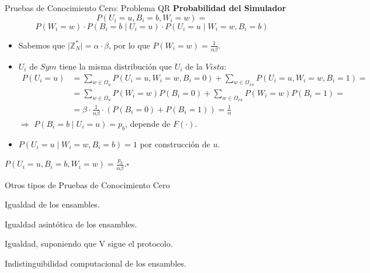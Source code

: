 \documentclass{beamer}
\begin{document}
\begin{frame}{Pruebas de Conocimiento Cero: Problema QR}
	\textbf{Probabilidad del Simulador}
	{\small\[P(U_i=u, B_i=b, W_i=w) = \]
	\[P(W_i=w)\cdot P(B_i=b \mid U_i=u) \cdot P(U_i=u \mid W_i=w, B_i=b)\]}
	\begin{itemize}
		\item {\small Sabemos que $\mid \mathbb{Z}^*_N \mid = \alpha \cdot \beta $, por lo que $P(W_i=w) = \frac{1}{\alpha \beta}$.}
		\item {\small $U_i$ de $Sym$ tiene la misma distribución que $U_i$ de la $Vista$:} {\tiny\begin{align*}
			P(U_i=u) &= \sum_{w\in \Omega_u} P(U_i=u, W_i=w, B_i = 0) + \sum_{w\in \Omega_{xu}} P(U_i=u, W_i=w, B_i = 1) =  \\
			&= \sum_{w\in \Omega_u} P(W_i=w)P(B_i = 0) + \sum_{w\in \Omega_{xu}} P(W_i=w)P(B_i = 1) = \\
			&=\beta \cdot \frac{1}{\alpha \beta} \cdot (P(B_i=0) + P(B_i=1)) = \frac{1}{\alpha}
			\end{align*}}
			{\small $\Rightarrow$ $P(B_i=b \mid U_i=u) = p_b$, depende de $F(\cdot)$.}
		
		\item %
		{\small$P(U_i=u \mid W_i=w, B_i=b) = 1$ por construcción de $u$.}
		
	\end{itemize}
	
	$P(U_i=u, B_i=b, W_i=w) = \frac{p_b}{\alpha \beta}$.\hfil $\square$
\end{frame}

\begin{frame}{Otros tipos de Pruebas de Conocimiento Cero}
	\begin{description}
		\item[$\uparrow$Perfectas] Igualdad de los ensambles.
		\item[]
		\item[Estadísticas] Igualdad asintótica de los ensambles.%
		\item[Verificador Honesto] Igualdad, suponiendo que V sigue el protocolo.
		\item[Computacionales] Indistinguibilidad computacional de los ensambles.%
	\end{description}
\end{frame}
\end{document}
